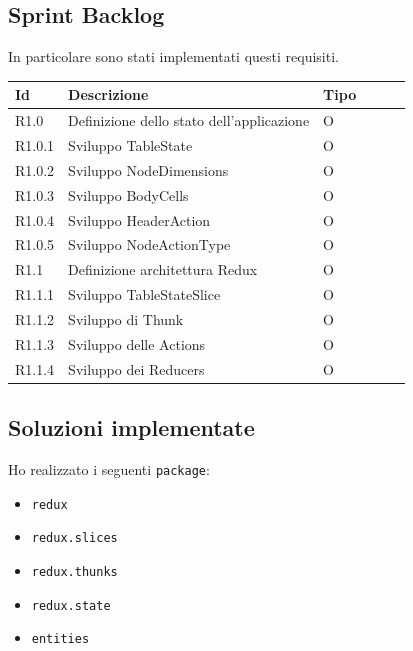 \subsection{Sprint Backlog}
In particolare sono stati implementati questi requisiti.
\begin{longtable} {
		|>{}p{10mm}| 
		|>{}p{90mm}|
		|>{}p{15mm}|
		|>{}p{15mm}|
		|>{}p{15mm}|
		>{}p{0mm}}
	\hline
	\textbf{Id} & \textbf{Descrizione} & \textbf{Tipo} \\ \hline
	R1.0 & Definizione dello stato dell'applicazione & O \\ \hline
	R1.0.1 & Sviluppo TableState        & O\\ \hline
	R1.0.2 & Sviluppo NodeDimensions    & O\\ \hline
	R1.0.3 & Sviluppo BodyCells         & O\\ \hline
	R1.0.4 & Sviluppo HeaderAction      & O\\ \hline
	R1.0.5 & Sviluppo NodeActionType    & O\\ \hline
	R1.1   & Definizione architettura Redux & O\\ \hline
	R1.1.1 & Sviluppo TableStateSlice    & O\\ \hline
	R1.1.2 & Sviluppo di Thunk & O\\ \hline
	R1.1.3 & Sviluppo delle Actions & O\\ \hline
	R1.1.4 & Sviluppo dei Reducers & O\\ \hline
\end{longtable}

\subsection{Soluzioni implementate}
Ho realizzato i seguenti \verb|package|:
\begin{itemize}
	\item \verb|redux|
	\item \verb|redux.slices|
	\item \verb|redux.thunks|
	\item \verb|redux.state|
	\item \verb|entities|
\end{itemize}

